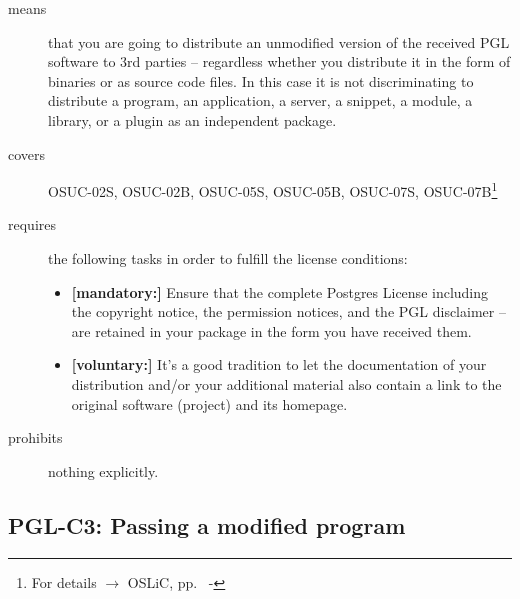 \begin{description}

\item[means] that you are going to distribute an unmodified version of the
received PGL software to 3rd parties -- regardless whether you distribute it in
the form of binaries or as source code files. In this case it is not
discriminating to distribute a program, an application, a server, a snippet, a
module, a library, or a plugin as an independent package.

\item[covers] OSUC-02S,  OSUC-02B, OSUC-05S, OSUC-05B, OSUC-07S,
OSUC-07B\footnote{For details $\rightarrow$ OSLiC, pp.\ \pageref{OSUC-02S-DEF} -
\pageref{OSUC-07B-DEF}}

\item[requires] the following tasks in order to fulfill the license conditions:
\begin{itemize}
  \item \textbf{[mandatory:]} Ensure that the complete Postgres License
  including the copyright notice, the permission notices, and the PGL disclaimer
  -- are retained in your package in the form you have received them.
  \item \textbf{[voluntary:]} It's a good tradition to let the documentation of
  your distribution and/or your additional material also contain a link to the
  original software (project) and its homepage.
\end{itemize}

\item[prohibits] nothing explicitly.

\end{description}

\subsection{PGL-C3: Passing a modified program}
\label{OSUC-04S-PGL} \label{OSUC-04B-PGL}


